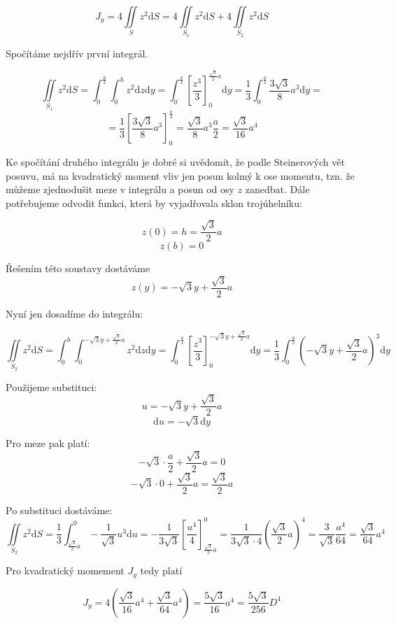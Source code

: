 \documentclass{article}
\begin{document}
\[ J_y=4\iint\limits_{S} z^2\mathrm{d}S = 4\iint\limits_{S_1} z^2\mathrm{d}S + 4\iint\limits_{S_2} z^2\mathrm{d}S\] 

Spočítáme nejdřív první integrál.

\[ \iint\limits_{S_1} z^2\mathrm{d}S = \int_{0}^{\frac{a}{2}} \int_{0}^{h} z^2 \mathrm{d}z \mathrm{d}y = 
\int_{0}^{\frac{a}{2}}\left[\frac{z^3}{3}\right]_0^{\frac{\sqrt{3}}{2}a} \mathrm{d}y = \frac{1}{3}\int_{0}^{\frac{a}{2}} \frac{3 \sqrt{3}}{8}a^3 \mathrm{d}y =\]
\[= \frac{1}{3} \left[ \frac{3 \sqrt{3}}{8}a^3 \right]_0^{\frac{a}{2}} = \frac{\sqrt{3}}{8}a^3 \frac{a}{2} = \frac{\sqrt{3}}{16}a^4\]

Ke spočítání druhého integrálu je dobré si uvědomit, že podle Steinerových vět posuvu, má na kvadratický moment vliv jen posun kolmý k ose momentu, 
tzn. že můžeme zjednodušit meze v integrálu a posun od osy $z$ zanedbat. Dále potřebujeme odvodit funkci, která by vyjadřovala sklon trojúhelníku:

\[ z(0)=h=\frac{\sqrt{3}}{2}a \] 
\[ z(b)=0 \]

Řešením této soustavy dostáváme
\[ z(y)=-\sqrt{3}y+\frac{\sqrt{3}}{2}a\]

Nyní jen dosadíme do integrálu:

\[ \iint\limits_{S_2} z^2\mathrm{d}S = \int_{0}^{b}\int_{0}^{-\sqrt{3}y+\frac{\sqrt{3}}{2}a} z^2 \mathrm{d}z \mathrm{d}y = 
\int_{0}^{\frac{a}{2}} \left[ \frac{z^3}{3}\right]_0^{-\sqrt{3}y+\frac{\sqrt{3}}{2}a} \mathrm{d}y 
= \frac{1}{3} \int_{0}^{\frac{a}{2}} \left(-\sqrt{3}y+\frac{\sqrt{3}}{2}a\right)^3 \mathrm{d}y\]

Použijeme substituci:
\[ u = -\sqrt{3}y+\frac{\sqrt{3}}{2}a\]
\[ \mathrm{d}u = -\sqrt{3} \mathrm{d}y\]

Pro meze pak platí:
\[ -\sqrt{3} \cdot \frac{a}{2} + \frac{\sqrt{3}}{2}a = 0\]
\[ -\sqrt{3} \cdot 0 + \frac{\sqrt{3}}{2}a = \frac{\sqrt{3}}{2}a\]

Po substituci dostáváme:
\[ \iint\limits_{S_2} z^2\mathrm{d}S = \frac{1}{3} \int_{\frac{\sqrt{3}}{2}a}^{0} -\frac{1}{\sqrt{3}}u^3 \mathrm{d}u 
= -\frac{1}{3\sqrt{3}} \left[\frac{u^4}{4}\right]_{\frac{\sqrt{3}}{2}a}^{0} = \frac{1}{3\sqrt{3} \cdot 4}\left(\frac{\sqrt{3}}{2}a\right)^4=
\frac{3}{\sqrt{3}}\frac{a^4}{64} = \frac{\sqrt{3}}{64}a^4\]


Pro kvadratický momement $J_y$ tedy platí

\[ J_y= 4 \left( \frac{\sqrt{3}}{16}a^4 + \frac{\sqrt{3}}{64}a^4 \right) = \frac{5\sqrt{3}}{16}a^4 = \frac{5\sqrt{3}}{256}D^4\]
\end{document}
